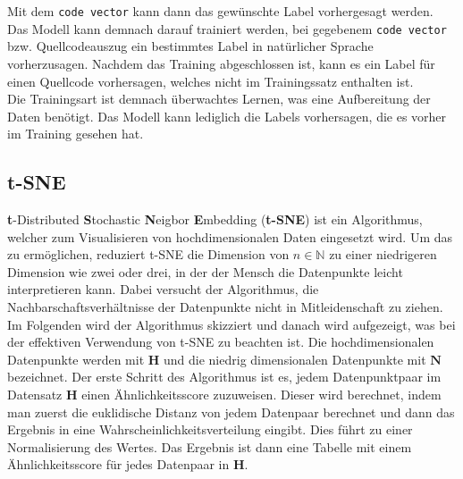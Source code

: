 \documentclass[12pt,letterpaper,ngerman]{article}
\begin{document}
Mit dem \verb|code vector| kann dann das gewünschte Label vorhergesagt 
werden. Das Modell kann demnach darauf trainiert werden, bei gegebenem 
\verb|code vector| bzw. Quellcodeauszug ein bestimmtes Label in 
natürlicher Sprache vorherzusagen. Nachdem das Training abgeschlossen 
ist, kann es ein Label für einen Quellcode vorhersagen, welches nicht 
im Trainingssatz enthalten ist.\\ 
Die Trainingsart ist demnach überwachtes Lernen, was eine Aufbereitung der
Daten benötigt. Das Modell kann lediglich die Labels vorhersagen, die es 
vorher im Training gesehen hat.
\subsection{t-SNE}
{\bf t}-Distributed {\bf S}tochastic {\bf N}eigbor {\bf E}mbedding
({\bf t-SNE}) ist ein Algorithmus, welcher zum Visualisieren von
hochdimensionalen Daten eingesetzt wird. Um das zu ermöglichen,
reduziert t-SNE die Dimension von $n \in \mathbb{N}$ zu einer niedrigeren 
Dimension wie zwei oder drei, in der der Mensch die Datenpunkte leicht 
interpretieren kann. Dabei versucht der Algorithmus, die
Nachbarschaftsverhältnisse der Datenpunkte nicht in Mitleidenschaft zu 
ziehen.\\

Im Folgenden wird der Algorithmus skizziert und danach wird aufgezeigt,
was bei der effektiven Verwendung von t-SNE zu beachten ist. Die
hochdimensionalen Datenpunkte werden mit $\mathbf{H}$ und die niedrig 
dimensionalen Datenpunkte mit $\mathbf{N}$ bezeichnet. Der erste Schritt 
des Algorithmus ist es, jedem Datenpunktpaar im Datensatz $\mathbf{H}$
einen Ähnlichkeitsscore zuzuweisen. Dieser wird berechnet, indem man 
zuerst die euklidische Distanz von jedem Datenpaar berechnet und dann das 
Ergebnis in eine Wahrscheinlichkeitsverteilung eingibt. Dies führt zu
einer Normalisierung des Wertes. Das Ergebnis ist dann eine Tabelle mit 
einem Ähnlichkeitsscore für jedes Datenpaar in $\mathbf{H}$.\\ 
\end{document}
